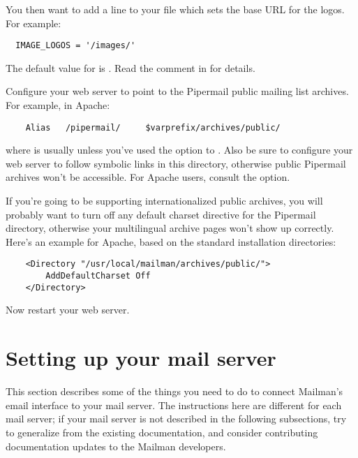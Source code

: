 \documentclass{howto}
\begin{document}
You then want to add a line to your 
file which sets the base URL for the logos.  For example:

\begin{verbatim}
  IMAGE_LOGOS = '/images/'
\end{verbatim}

The default value for  is .  Read the comment
in  for details.

Configure your web server to point to the Pipermail public mailing list
archives.  For example, in Apache:

\begin{verbatim}
    Alias   /pipermail/     $varprefix/archives/public/
\end{verbatim}

where  is usually  unless you've used the
 option to .  Also be
sure to configure your web server to follow symbolic links in this directory,
otherwise public Pipermail archives won't be accessible.  For Apache users,
consult the  option.

If you're going to be supporting internationalized public archives, you will
probably want to turn off any default charset directive for the Pipermail
directory, otherwise your multilingual archive pages won't show up correctly.
Here's an example for Apache, based on the standard installation directories:

\begin{verbatim}
    <Directory "/usr/local/mailman/archives/public/">
        AddDefaultCharset Off
    </Directory>
\end{verbatim}

Now restart your web server.

\section{Setting up your mail server\label{mail-server}}

This section describes some of the things you need to do to connect Mailman's
email interface to your mail server.  The instructions here are different for
each mail server; if your mail server is not described in the following
subsections, try to generalize from the existing documentation, and consider
contributing documentation updates to the Mailman developers.
\end{document}
